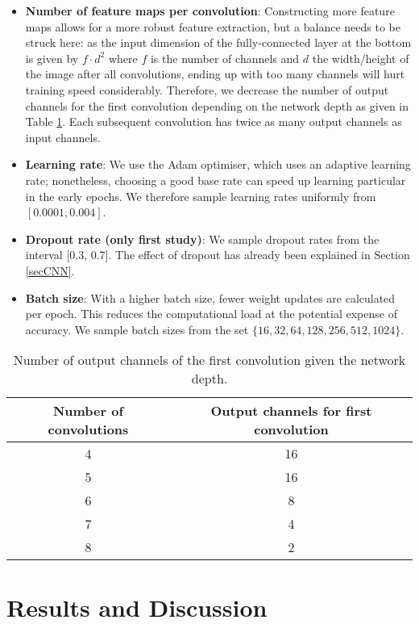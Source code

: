 \documentclass[british,12p]{article}
\begin{document}
\begin{itemize}
    	\item \textbf{Number of feature maps per convolution}: Constructing more feature maps allows for a more robust feature extraction, but a balance needs to be struck here: as the input dimension of the fully-connected layer at the bottom is given by $f \cdot d^2$ where $f$ is the number of channels and $d$ the width/height of the image after all convolutions, ending up with too many channels will hurt training speed considerably. Therefore, we decrease the number of output channels for the first convolution depending on the network depth as given in Table \ref{tab-cout}. Each subsequent convolution has twice as many output channels as input channels. 
    	\item \textbf{Learning rate}: We use the Adam optimiser, which uses an adaptive learning rate; nonetheless, choosing a good base rate can speed up learning particular in the early epochs. We therefore sample learning rates uniformly from $[0.0001, 0.004]$.\
    	\item \textbf{Dropout rate (only first study)}: We sample dropout rates from the interval [0.3, 0.7]. The effect of dropout has already been explained in Section \ref{secCNN}.
    	\item \textbf{Batch size}: With a higher batch size, fewer weight updates are calculated per epoch. This reduces the computational load at the potential expense of accuracy. We sample batch sizes from the set $\{16, 32, 64, 128, 256, 512, 1024\}$.

    \end{itemize}
    \begin{table}
    \begin{center}
    \begin{tabular}{c|c}
  		Number of convolutions & Output channels for first convolution  \\
  		\hline\hline
  		4 & 16\\\hline 
  		5 & 16\\\hline 
  		6 & 8\\\hline 
  		7 & 4\\\hline 
  		8 & 2\\\hline 
  		 
	\end{tabular}
	\caption{Number of output channels of the first convolution given the network depth.}
	\label{tab-cout}
	\end{center}
	 \end{table}
    
    
    \section{Results and Discussion}
    
\end{document}
